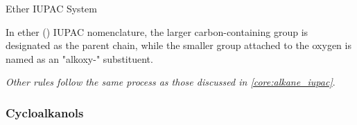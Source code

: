 \documentclass[10pt]{article}
\begin{document}
      \begin{core}[label=core:ether_iupac]{Ether IUPAC System}

        In ether () IUPAC nomenclature, the larger carbon-containing group is designated as the parent chain, while the smaller group attached to the oxygen is named as an "alkoxy-" substituent.

        \vspace{-0.5cm}

        \textit{Other rules follow the same process as those discussed in \autoref{core:alkane_iupac}}.

      \end{core}

    \subsubsection{Cycloalkanols}
\end{document}
